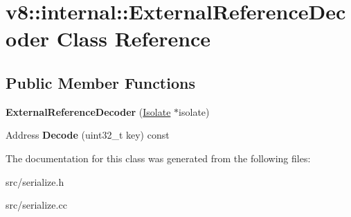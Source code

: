 \hypertarget{classv8_1_1internal_1_1_external_reference_decoder}{}\section{v8\+:\+:internal\+:\+:External\+Reference\+Decoder Class Reference}
\label{classv8_1_1internal_1_1_external_reference_decoder}
\subsection*{Public Member Functions}
\begin{DoxyCompactItemize}
\item 
\hypertarget{classv8_1_1internal_1_1_external_reference_decoder_a99e130a76068f5c29023636bf6dbf1ce}{}{\bfseries External\+Reference\+Decoder} (\hyperlink{classv8_1_1internal_1_1_isolate}{Isolate} $\ast$isolate)\label{classv8_1_1internal_1_1_external_reference_decoder_a99e130a76068f5c29023636bf6dbf1ce}

\item 
\hypertarget{classv8_1_1internal_1_1_external_reference_decoder_a413a43b0e6a1dfa552139a55ca266467}{}Address {\bfseries Decode} (uint32\+\_\+t key) const \label{classv8_1_1internal_1_1_external_reference_decoder_a413a43b0e6a1dfa552139a55ca266467}

\end{DoxyCompactItemize}


The documentation for this class was generated from the following files\+:\begin{DoxyCompactItemize}
\item 
src/serialize.\+h\item 
src/serialize.\+cc\end{DoxyCompactItemize}
